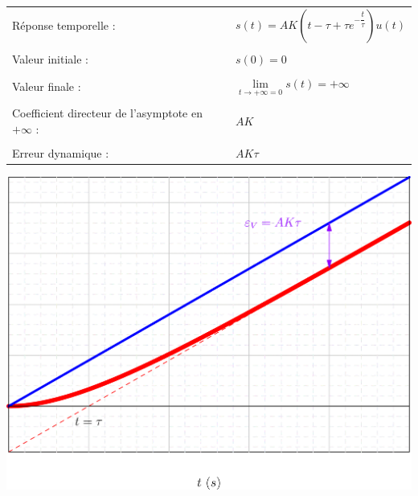 \documentclass[11pt,oneside]{article}
\begin{document}
\begin{minipage}[c]{.4\linewidth}
\begin{center}
\begin{tabular}{ll}
Réponse temporelle : & 
$s(t)=AK\left( t-\tau+\tau e^{-\dfrac{t}{\tau}}
\right) u(t)$  \\
& \\
Valeur initiale : & $s(0)=0$ \\
& \\
Valeur finale : & $\lim\limits_{t\to +\infty = 0}s(t)=+\infty $\\
& \\
Coefficient directeur de l'asymptote en $+\infty $ :& $AK$\\
& \\
Erreur dynamique : & $AK\tau$\\
\end{tabular}
\end{center}
\end{minipage}



\begin{center}
\includegraphics[width=.5\textwidth]{png/ordre1_rampe}
\end{center}
\end{document}
